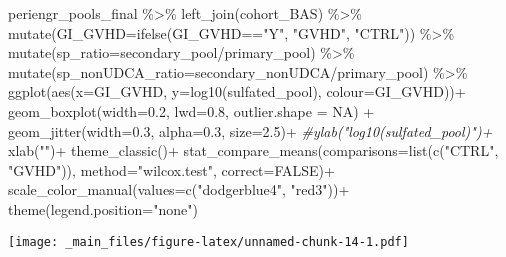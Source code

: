 \documentclass[
]{book}
\newenvironment{Shaded}{\begin{snugshade}}{\end{snugshade}}
\newcommand{\AttributeTok}[1]{\textcolor[rgb]{0.77,0.63,0.00}{#1}}
\newcommand{\CommentTok}[1]{\textcolor[rgb]{0.56,0.35,0.01}{\textit{#1}}}
\newcommand{\ConstantTok}[1]{\textcolor[rgb]{0.00,0.00,0.00}{#1}}
\newcommand{\FloatTok}[1]{\textcolor[rgb]{0.00,0.00,0.81}{#1}}
\newcommand{\FunctionTok}[1]{\textcolor[rgb]{0.00,0.00,0.00}{#1}}
\newcommand{\NormalTok}[1]{#1}
\newcommand{\SpecialCharTok}[1]{\textcolor[rgb]{0.00,0.00,0.00}{#1}}
\newcommand{\StringTok}[1]{\textcolor[rgb]{0.31,0.60,0.02}{#1}}
\begin{document}
\begin{Shaded}
\begin{Highlighting}[]
\NormalTok{periengr\_pools\_final }\SpecialCharTok{\%\textgreater{}\%} 
  \FunctionTok{left\_join}\NormalTok{(cohort\_BAS) }\SpecialCharTok{\%\textgreater{}\%}
  \FunctionTok{mutate}\NormalTok{(}\AttributeTok{GI\_GVHD=}\FunctionTok{ifelse}\NormalTok{(GI\_GVHD}\SpecialCharTok{==}\StringTok{"Y"}\NormalTok{, }\StringTok{"GVHD"}\NormalTok{, }\StringTok{"CTRL"}\NormalTok{))  }\SpecialCharTok{\%\textgreater{}\%} 
  \FunctionTok{mutate}\NormalTok{(}\AttributeTok{sp\_ratio=}\NormalTok{secondary\_pool}\SpecialCharTok{/}\NormalTok{primary\_pool) }\SpecialCharTok{\%\textgreater{}\%} 
  \FunctionTok{mutate}\NormalTok{(}\AttributeTok{sp\_nonUDCA\_ratio=}\NormalTok{secondary\_nonUDCA}\SpecialCharTok{/}\NormalTok{primary\_pool) }\SpecialCharTok{\%\textgreater{}\%} 
  \FunctionTok{ggplot}\NormalTok{(}\FunctionTok{aes}\NormalTok{(}\AttributeTok{x=}\NormalTok{GI\_GVHD, }\AttributeTok{y=}\FunctionTok{log10}\NormalTok{(sulfated\_pool), }\AttributeTok{colour=}\NormalTok{GI\_GVHD))}\SpecialCharTok{+}
  \FunctionTok{geom\_boxplot}\NormalTok{(}\AttributeTok{width=}\FloatTok{0.2}\NormalTok{, }\AttributeTok{lwd=}\FloatTok{0.8}\NormalTok{, }\AttributeTok{outlier.shape =} \ConstantTok{NA}\NormalTok{) }\SpecialCharTok{+}
  \FunctionTok{geom\_jitter}\NormalTok{(}\AttributeTok{width=}\FloatTok{0.3}\NormalTok{, }\AttributeTok{alpha=}\FloatTok{0.3}\NormalTok{, }\AttributeTok{size=}\FloatTok{2.5}\NormalTok{)}\SpecialCharTok{+}
  \CommentTok{\#ylab("log10(sulfated\_pool)")+}
  \FunctionTok{xlab}\NormalTok{(}\StringTok{""}\NormalTok{)}\SpecialCharTok{+}
  \FunctionTok{theme\_classic}\NormalTok{()}\SpecialCharTok{+}
  \FunctionTok{stat\_compare\_means}\NormalTok{(}\AttributeTok{comparisons=}\FunctionTok{list}\NormalTok{(}\FunctionTok{c}\NormalTok{(}\StringTok{"CTRL"}\NormalTok{, }\StringTok{"GVHD"}\NormalTok{)),}
                     \AttributeTok{method=}\StringTok{"wilcox.test"}\NormalTok{,}
                     \AttributeTok{correct=}\ConstantTok{FALSE}\NormalTok{)}\SpecialCharTok{+}
  \FunctionTok{scale\_color\_manual}\NormalTok{(}\AttributeTok{values=}\FunctionTok{c}\NormalTok{(}\StringTok{"dodgerblue4"}\NormalTok{, }\StringTok{"red3"}\NormalTok{))}\SpecialCharTok{+}
  \FunctionTok{theme}\NormalTok{(}\AttributeTok{legend.position=}\StringTok{"none"}\NormalTok{)}
\end{Highlighting}
\end{Shaded}

\texttt{[image: \_main\_files/figure-latex/unnamed-chunk-14-1.pdf]}
\end{document}
